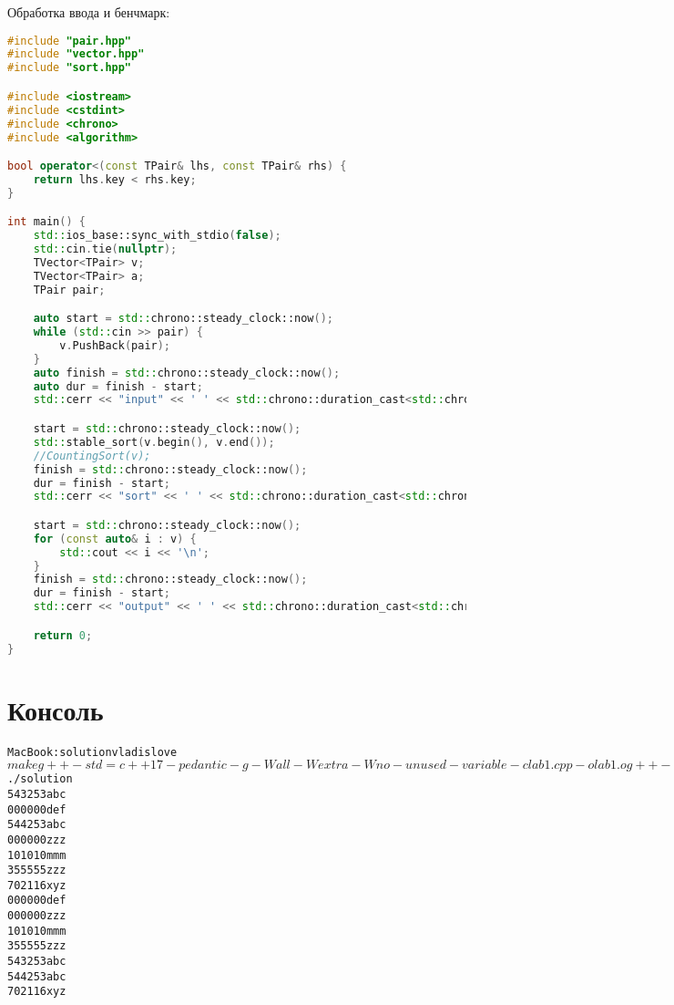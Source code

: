 Обработка ввода и бенчмарк:

\begin{lstlisting}[language=C++]
    #include "pair.hpp"
#include "vector.hpp"
#include "sort.hpp"

#include <iostream>
#include <cstdint>
#include <chrono>
#include <algorithm>

bool operator<(const TPair& lhs, const TPair& rhs) {
    return lhs.key < rhs.key;
}

int main() {
    std::ios_base::sync_with_stdio(false);
    std::cin.tie(nullptr);
    TVector<TPair> v;
    TVector<TPair> a;
    TPair pair;

    auto start = std::chrono::steady_clock::now();
    while (std::cin >> pair) {
        v.PushBack(pair);
    }
    auto finish = std::chrono::steady_clock::now();
    auto dur = finish - start;
    std::cerr << "input" << ' ' << std::chrono::duration_cast<std::chrono::milliseconds>(dur).count() << " ms" << std::endl;

    start = std::chrono::steady_clock::now();
    std::stable_sort(v.begin(), v.end());
    //CountingSort(v);
    finish = std::chrono::steady_clock::now();
    dur = finish - start;
    std::cerr << "sort" << ' ' << std::chrono::duration_cast<std::chrono::milliseconds>(dur).count() << " ms" << std::endl;

    start = std::chrono::steady_clock::now();
    for (const auto& i : v) {
        std::cout << i << '\n';
    }
    finish = std::chrono::steady_clock::now();
    dur = finish - start;
    std::cerr << "output" << ' ' << std::chrono::duration_cast<std::chrono::milliseconds>(dur).count() << " ms" << std::endl;

    return 0;
}  
\end{lstlisting}

\pagebreak

\section{Консоль}

\begin{alltt}
    MacBook:solution vladislove$ make
    g++ -std=c++17 -pedantic -g -Wall -Wextra -Wno-unused-variable -c lab1.cpp -o lab1.o
    g++ -std=c++17 -pedantic -g -Wall -Wextra -Wno-unused-variable lab1.o -o solution
    MacBook:solution vladislove$ ./solution
    543253 abc
    000000 def
    544253 abc
    000000 zzz
    101010 mmm
    355555 zzz
    702116 xyz
    000000  def
    000000  zzz
    101010  mmm
    355555  zzz
    543253  abc
    544253  abc
    702116  xyz
\end{alltt}

\pagebreak

